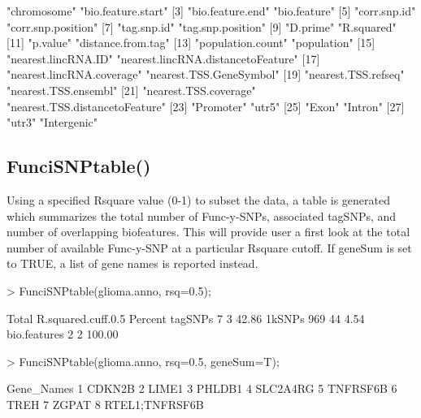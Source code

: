 \documentclass[a4paper]{article}
\begin{document}
\begin{Schunk}
\begin{Sinput}
\end{Sinput}
\begin{Soutput}
 [1] "chromosome"                        "bio.feature.start"                
 [3] "bio.feature.end"                   "bio.feature"                      
 [5] "corr.snp.id"                       "corr.snp.position"                
 [7] "tag.snp.id"                        "tag.snp.position"                 
 [9] "D.prime"                           "R.squared"                        
[11] "p.value"                           "distance.from.tag"                
[13] "population.count"                  "population"                       
[15] "nearest.lincRNA.ID"                "nearest.lincRNA.distancetoFeature"
[17] "nearest.lincRNA.coverage"          "nearest.TSS.GeneSymbol"           
[19] "nearest.TSS.refseq"                "nearest.TSS.ensembl"              
[21] "nearest.TSS.coverage"              "nearest.TSS.distancetoFeature"    
[23] "Promoter"                          "utr5"                             
[25] "Exon"                              "Intron"                           
[27] "utr3"                              "Intergenic"                       
\end{Soutput}
\end{Schunk}
\subsection*{FunciSNPtable()}
Using a specified Rsquare value (0-1) to subset the data, a table is generated 
which summarizes the total number of Func-y-SNPs, associated tagSNPs, and number
 of overlapping biofeatures. This will provide user a first look at the total 
 number of available Func-y-SNP at a particular Rsquare cutoff.  If geneSum is 
 set to TRUE, a list of gene names is reported instead.
\begin{Schunk}
\begin{Sinput}
> FunciSNPtable(glioma.anno, rsq=0.5);
\end{Sinput}
\begin{Soutput}
             Total R.squared.cuff.0.5 Percent
tagSNPs          7                  3   42.86
1kSNPs         969                 44    4.54
bio.features     2                  2  100.00
\end{Soutput}
\begin{Sinput}
> FunciSNPtable(glioma.anno, rsq=0.5, geneSum=T);
\end{Sinput}
\begin{Soutput}
      Gene_Names
1         CDKN2B
2          LIME1
3         PHLDB1
4       SLC2A4RG
5       TNFRSF6B
6           TREH
7          ZGPAT
8 RTEL1;TNFRSF6B
\end{Soutput}
\end{Schunk}
\end{document}
